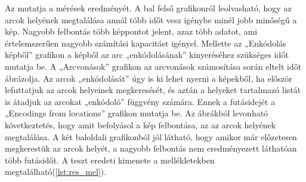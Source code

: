 
Az  mutatja a mérések eredményét. A bal felső grafikonról leolvasható, hogy az arcok helyének megtalálása annál több időt vesz igénybe minél jobb minőségű a kép. Nagyobb felbontás több képpontot jelent, azaz több adatot, ami értelemszerűen nagyobb számítási kapacitást igényel. Mellette az „Enkódolás képből” grafikon a képből az arc „enkódolásának” kinyeréséhez szükséges időt mutatja be. A „Arcvonások” grafikon az arcvonások számosítása során eltelt időt ábrázolja. Az arcok „enkódolását” úgy is ki lehet nyerni a képekből, ha először lefuttatjuk az arcok helyeinek megkeresését, és aztán a helyeket tartalmazó listát is átadjuk az arcokat „enkódoló” függvény számára. Ennek a futásidejét a „Encodings from locations” grafikon mutatja be. Az ábrákból levonható következtetés, hogy amit befolyásol a kép felbontása, az az arcok helyének megtalálása. A két baloldali grafikonból jól látható, hogy amikor már előzetesen megkerestük az arcok helyét, a nagyobb felbontás nem eredményezett láthatóan több futásidőt. A teszt eredeti kimenete a mellékletekben megtalálható(\ref{lst:res_mel}).
